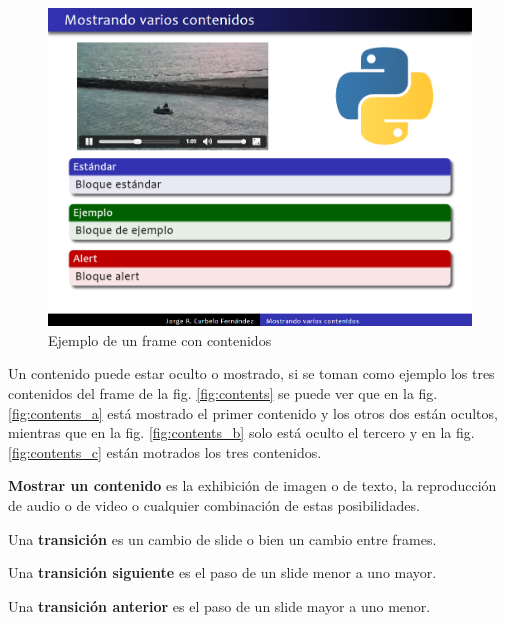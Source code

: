  		\begin{figure}[tb]
 			\centering
 			\includegraphics[width=12cm]{img/frame-video-image}
 			\caption{Ejemplo de un frame con contenidos}
 			\label{fig:frame_video_image}
 		\end{figure}

 		Un contenido puede estar oculto o mostrado, si se toman como ejemplo los tres contenidos del frame de la fig. \ref{fig:contents} se puede ver que en la fig. \ref{fig:contents_a} está mostrado el primer contenido y los otros dos están ocultos, mientras que en la fig. \ref{fig:contents_b} solo está oculto el tercero y en la fig. \ref{fig:contents_c} están motrados los tres contenidos.		

		\begin{definition}
		\label{def:show}
			\textbf{Mostrar un contenido} es la exhibición de imagen o de texto, la reproducción de audio o de video o cualquier combinación de estas posibilidades.
		\end{definition} 		


 		\begin{definition}
 		\label{def:transition}
 			Una \textbf{transición} es un cambio de slide o bien un cambio entre frames.
 		\end{definition}

 		\begin{definition}
 		\label{def:next_transition}
 			Una \textbf{transición siguiente} es el paso de un slide menor a uno mayor.
 		\end{definition} 		

 		\begin{definition}
 		\label{def:prev_transition}
 			Una \textbf{transición anterior} es el paso de un slide mayor a uno menor.
 		\end{definition}

